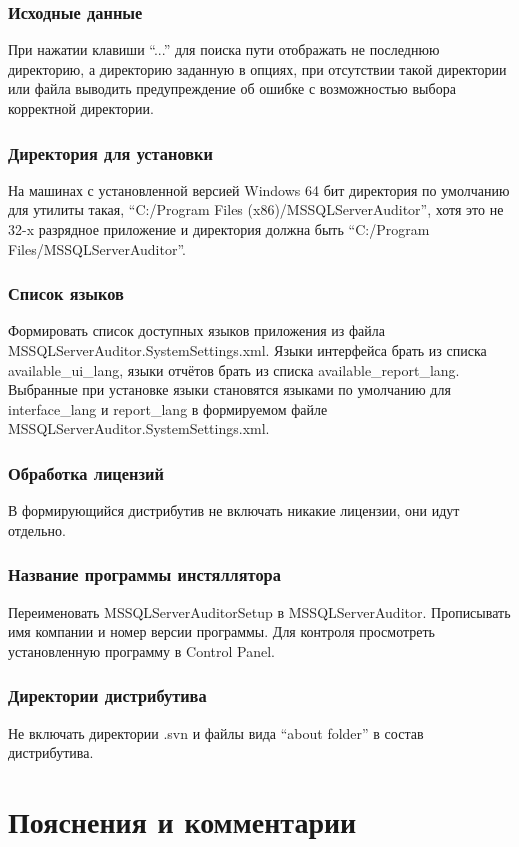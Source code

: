 \subsubsection{Исходные данные}

При нажатии клавиши ``...'' для поиска пути отображать не последнюю директорию, а директорию
заданную в опциях, при отсутствии такой директории или файла выводить предупреждение об ошибке с
возможностью выбора корректной директории.

\subsubsection{Директория для установки}

На машинах с установленной версией Windows 64 бит директория по умолчанию для утилиты такая,
``C:/Program Files (x86)/MSSQLServerAuditor'', хотя это не 32-x разрядное приложение и директория
должна быть ``C:/Program Files/MSSQLServerAuditor''.

\subsubsection{Список языков}

Формировать список доступных языков приложения из файла MSSQL\-ServerAuditor\-.SystemSettings\-.xml.
Языки интерфейса брать из списка available\-\_ui\_lang, языки отчётов брать из списка
available\-\_report\-\_lang. Выбранные при установке языки становятся языками по умолчанию для
interface\-\_lang и report\-\_lang в формируемом файле MSSQL\-ServerAuditor\-.SystemSettings\-.xml.

\subsubsection{Обработка лицензий}

В формирующийся дистрибутив не включать никакие лицензии, они идут отдельно.

\subsubsection{Название программы инстяллятора}

Переименовать MSSQLServerAuditorSetup в MSSQLServerAuditor. Прописывать имя компании и номер версии
программы. Для контроля просмотреть установленную программу в Control Panel.

\subsubsection{Директории дистрибутива}

Не включать директории .svn и файлы вида ``about folder'' в состав дистрибутива.

\section{Пояснения и комментарии}


